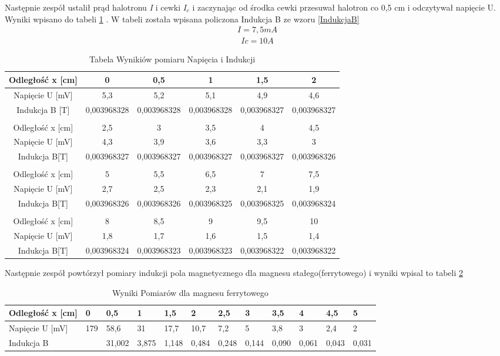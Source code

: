 \documentclass{article}
\begin{document}
Następnie zespół ustalił prąd halotronu \textit{I} i cewki $I_c$ i zaczynając od środka cewki przesuwał halotron co 0,5 cm i odczytywał napięcie U.
Wyniki wpisano  do tabeli  \ref{tab:2} . W tabeli została wpisana policzona Indukcja B ze wzoru \ref{IndukcjaB}
\begin{align*}
    \textit{I}=7,5\si{mA}
\end{align*}
\begin{align*}
    \textit{Ic}=10  \si{A} 
\end{align*}
\begin{table}[H]
    \centering
    \begin{tabular}{|c|c|c|c|c|c|}
    \hline
        Odległość x [cm] & 0 & 0,5 & 1 & 1,5 & 2   \\ \hline
        Napięcie U [mV] & 5,3 & 5,2 & 5,1 & 4,9 & 4,6   \\ \hline
        Indukcja B [T] & 0,003968328 & 0,003968328 & 0,003968328 & 0,003968327 & 0,003968327   \\\hline  \\\hline
        Odległość x [cm] &  2,5 & 3 & 3,5 & 4 & 4,5   \\ \hline
        Napięcie U [mV] & 4,3 & 3,9 & 3,6 & 3,3 &3  \\ \hline
        Indukcja B[T]  & 0,003968327 & 0,003968327 & 0,003968327 & 0,003968327 & 0,003968326  \\\hline  \\\hline
        Odległość x [cm] & 5  & 5,5 & 6,5 & 7 & 7,5     \\\hline
        Napięcie U [mV]  & 2,7& 2,5 & 2,3 & 2,1 & 1,9 \\ \hline
        Indukcja B[T] & 0,003968326 & 0,003968326 & 0,003968325 & 0,003968325 & 0,003968324 \\\hline  \\\hline
        Odległość x [cm]  & 8 & 8,5 & 9 & 9,5 & 10     \\\hline
        Napięcie U [mV]  & 1,8 & 1,7 & 1,6 &1,5 & 1,4  \\ \hline
        Indukcja B[T] & 0,003968324 & 0,003968323 & 0,003968323 & 0,003968322 & 0,003968322 \\ \hline
    \end{tabular}
    \caption{Tabela Wynikiów pomiaru Napięcia i Indukcji}
    \label{tab:2}
\end{table}

Następnie zespół powtórzył pomiary indukcji  pola magnetycznego dla magnesu stałego(ferrytowego) i wyniki wpisal to tabeli \ref{tab:4}
\begin{table}[!ht]
    \centering
    \begin{tabular}{|l|l|l|l|l|l|l|l|l|l|l|l|}
    \hline
        Odległość x [cm] & 0 & 0,5 & 1 & 1,5 & 2 & 2,5 & 3 & 3,5 & 4 & 4,5 & 5 \\ \hline
        Napięcie U [mV] & 179 & 58,6 & 31 & 17,7 & 10,7 & 7,2 & 5 & 3,8 & 3 & 2,4 & 2 \\ \hline
         Indukcja B & ~ & 31,002 & 3,875 & 1,148 & 0,484 & 0,248 & 0,144 & 0,090 & 0,061 & 0,043 & 0,031 \\ \hline
    \end{tabular} 
    \caption{Wyniki Pomiarów dla magnesu ferrytowego}
    \label{tab:4}
\end{table}
\end{document}
